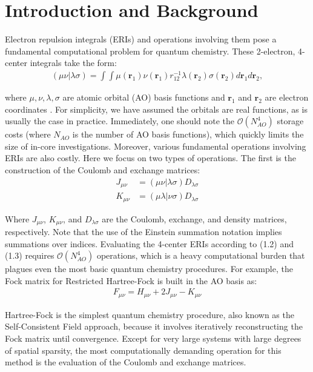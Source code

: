 \chapter{Introduction and Background}

Electron repulsion integrals (ERIs) and operations involving them pose a fundamental
computational problem for quantum chemistry. These 2-electron, 4-center integrals take the form:
\begin{align}(\mu \nu | \lambda \sigma) = \int \int \mu(\textbf{r}_{1}) 
\nu(\textbf{r}_{1}) r^{-1}_{12} \lambda(\textbf{r}_{2}) \sigma(\textbf{r}_{2}) 
d{\textbf{r}_{1}}d{\textbf{r}_{2}},
\end{align}

\noindent where $\mu, \nu, \lambda, \sigma$ are atomic orbital (AO) basis functions and $\textbf{r}_{1}$ and $\textbf{r}_{2}$
are electron coordinates \cite{ref1}. For simplicity, we have assumed the orbitals are real functions, as is usually
the case in practice. Immediately, one should note the $\mathcal{O}(N_{AO}^4)$ storage costs (where $N_{AO}$ is
the number of AO basis functions), which quickly 
limits the size of in-core investigations. Moreover, various fundamental operations involving ERIs 
are also costly. Here we focus on two types of operations. 
The first is the construction of the Coulomb and exchange matrices:
\begin{align}
J_{\mu \nu} &= (\mu \nu|\lambda \sigma)D_{\lambda \sigma} \\
K_{\mu \nu} &= (\mu \lambda|\nu \sigma)D_{\lambda \sigma}
\end{align}

\noindent Where $J_{\mu \nu}$, $K_{\mu \nu}$, 
and $D_{\lambda \sigma}$ are the Coulomb, exchange, and density matrices, respectively.
Note that the use of the Einstein summation notation implies summations over indices.
Evaluating the 4-center ERIs according to (1.2) and (1.3) requires $\mathcal{O}(N_{AO}^4)$ operations, 
which is a heavy computational burden that plagues even the most basic quantum chemistry procedures.
For example, the Fock matrix for Restricted Hartree-Fock is built in the AO basis as:
\begin{align}
F_{\mu \nu} = H_{\mu \nu} + 2J_{\mu \nu} - K_{\mu \nu}
\end{align} 

Hartree-Fock is the simplest quantum chemistry procedure, also known as the Self-Consistent Field approach, 
because it involves iteratively
reconstructing the Fock matrix until convergence. Except for very large systems with large degrees of spatial sparsity, 
the most computationally demanding operation for this
method is the evaluation of the Coulomb and exchange matrices. 
 

